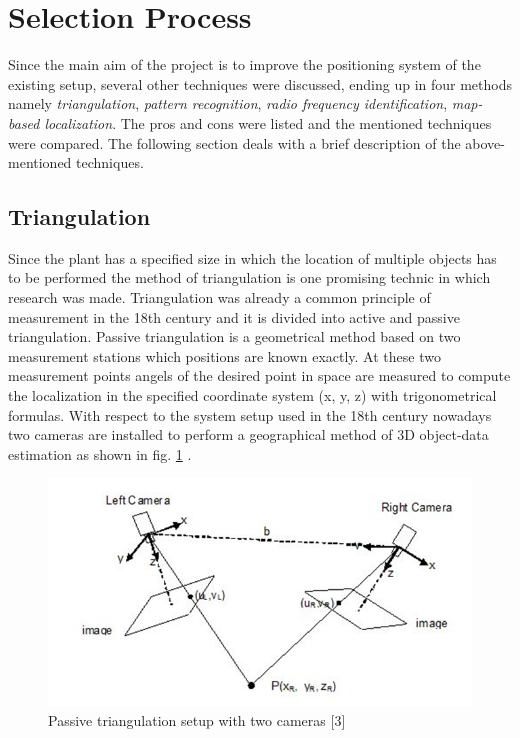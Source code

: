 \section{Selection Process} \label{Sec_selectionp}

Since the main aim of the project is to improve the positioning system of the existing setup, several other techniques were discussed, ending up in four methods namely \textit{triangulation}, \textit{pattern recognition}, \textit{radio frequency identification}, \textit{map-based localization}. The pros and cons were listed and the mentioned techniques were compared. The following section deals with a brief description of the above-mentioned techniques.\\

\subsection{Triangulation} %
Since the plant has a specified size in which the location of multiple objects has to be performed the method of triangulation is one promising technic in which research was made. 
Triangulation was already a common principle of measurement in the 18th century and it is divided into active and passive triangulation. Passive triangulation is a geometrical method based on two measurement stations which positions are known exactly. At these two measurement points angels of the desired point in space are measured to compute the localization in the specified coordinate system (x, y, z) with trigonometrical formulas.
With respect to the system setup used in the 18th century nowadays two cameras are installed to perform a geographical method of 3D object-data estimation as shown in fig. \ref{Triangulation} \cite{Prinzip3DVideometrie.}.
\begin{figure}[!htbp]
\centering
\includegraphics[width = 16cm]{Pictures/Triangulation}
\caption{Passive triangulation setup with two cameras [3]}
\label{Triangulation}
\end{figure}\\

